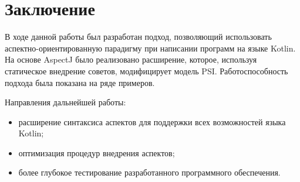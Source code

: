\documentclass[conference]{IEEEtran}
\begin{document}


\section{Заключение}

В ходе данной работы был разработан подход, позволяющий использовать
аспектно-ориентированную парадигму при написании программ на языке Kotlin.
На основе AspectJ было реализовано расширение, которое, используя статическое 
внедрение советов, модифицирует модель PSI.
Работоспособность подхода была показана на ряде примеров.

Направления дальнейшей работы:
\begin{itemize}
    \item расширение синтаксиса аспектов для поддержки всех возможностей языка
          Kotlin;
    \item оптимизация процедур внедрения аспектов;
    \item более глубокое тестирование разработанного программного обеспечения.
\end{itemize}
\end{document}
